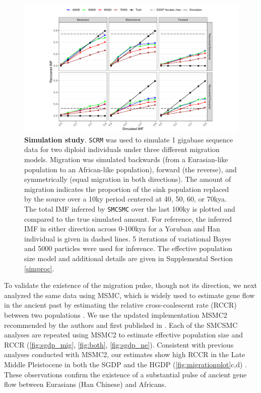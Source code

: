 \begin{figure}
  \centering
  \includegraphics[width=\textwidth]{plot/sim_line_plot.pdf}
  \caption[Simulation Study]{\textbf{Simulation study}. {\tt SCRM} was used to simulate 1 gigabase sequence data for two diploid individuals under three different migration models. Migration was simulated backwards (from a Eurasian-like population to an African-like population), forward (the reverse), and symmetrically (equal migration in both directions). The amount of migration indicates the proportion of the sink population replaced by the source over a 10ky period centered at 40, 50, 60, or 70kya. The total IMF inferred by {\tt SMCSMC} over the last 100ky is plotted and compared to the true simulated amount. For reference, the inferred IMF in either direction across 0-100kya for a Yoruban and Han individual is given in dashed lines.  5 iterations of variational Bayes and 5000 particles were used for inference. The effective population size model and additional details are given in Supplemental Section \ref{simproc}.}
  \label{fig:sim}
\end{figure}


To validate the existence of the migration pulse, though not its direction, we next analyzed the same data using MSMC, which is widely used to estimate gene flow in the ancient past by estimating the relative cross-coalescent rate (RCCR) between two populations \cite{Schiffels2014,Fan2019, Pagani2015, Raghavan2015}. We use the updated implementation MSMC2 recommended by the authors and first published in \cite{Malaspinas2016}. Each of the SMCSMC analyses are repeated using MSMC2 to estimate effective population size and RCCR (\autoref{fig:sgdp_mig}, \autoref{fig:both}, \autoref{fig:sgdp_ne}). Consistent with previous analyses conducted with MSMC2, our estimates show high RCCR in the Late Middle Pleistocene in both the SGDP and the HGDP (\autoref{fig:migrationplot}c,d) \cite{Fan2019, Bergstrom2019}. These observations confirm the existence of a substantial pulse of ancient gene flow between Eurasians (Han Chinese) and Africans.


